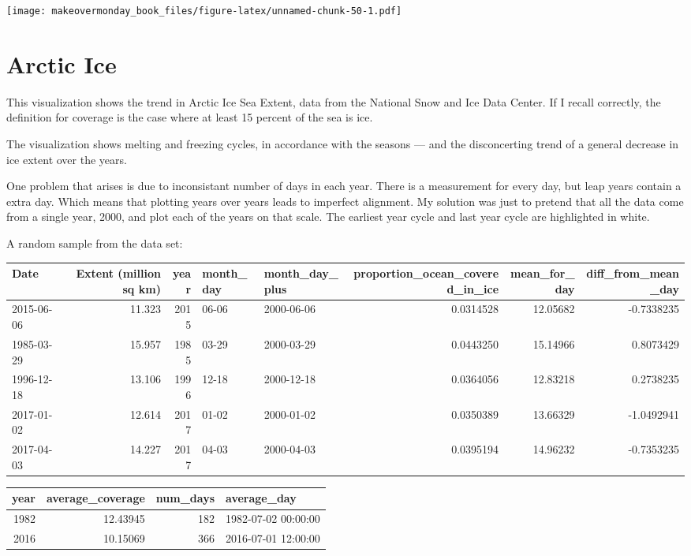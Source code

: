 \documentclass[]{book}
\theoremstyle{definition}
\theoremstyle{definition}
\theoremstyle{definition}
\theoremstyle{remark}
\begin{document}
\texttt{[image: makeovermonday\_book\_files/figure-latex/unnamed-chunk-50-1.pdf]}

\chapter{Arctic Ice}\label{arctic-ice}

This visualization shows the trend in Arctic Ice Sea Extent, data from
the National Snow and Ice Data Center. If I recall correctly, the
definition for coverage is the case where at least 15 percent of the sea
is ice.

The visualization shows melting and freezing cycles, in accordance with
the seasons --- and the disconcerting trend of a general decrease in ice
extent over the years.

One problem that arises is due to inconsistant number of days in each
year. There is a measurement for every day, but leap years contain a
extra day. Which means that plotting years over years leads to imperfect
alignment. My solution was just to pretend that all the data come from a
single year, 2000, and plot each of the years on that scale. The
earliest year cycle and last year cycle are highlighted in white.

A random sample from the data set:

\begin{tabular}{l|r|r|l|l|r|r|r}
\hline
Date & Extent (million sq km) & year & month\_day & month\_day\_plus & proportion\_ocean\_covered\_in\_ice & mean\_for\_day & diff\_from\_mean\_day\\
\hline
2015-06-06 & 11.323 & 2015 & 06-06 & 2000-06-06 & 0.0314528 & 12.05682 & -0.7338235\\
\hline
1985-03-29 & 15.957 & 1985 & 03-29 & 2000-03-29 & 0.0443250 & 15.14966 & 0.8073429\\
\hline
1996-12-18 & 13.106 & 1996 & 12-18 & 2000-12-18 & 0.0364056 & 12.83218 & 0.2738235\\
\hline
2017-01-02 & 12.614 & 2017 & 01-02 & 2000-01-02 & 0.0350389 & 13.66329 & -1.0492941\\
\hline
2017-04-03 & 14.227 & 2017 & 04-03 & 2000-04-03 & 0.0395194 & 14.96232 & -0.7353235\\
\hline
\end{tabular}

\begin{tabular}{r|r|r|l}
\hline
year & average\_coverage & num\_days & average\_day\\
\hline
1982 & 12.43945 & 182 & 1982-07-02 00:00:00\\
\hline
2016 & 10.15069 & 366 & 2016-07-01 12:00:00\\
\hline
\end{tabular}
\end{document}
